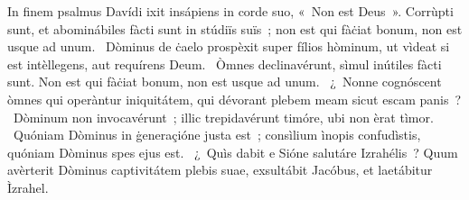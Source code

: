 { In finem psalmus Davídi}
{%
ixit insápiens in corde suo, «~Non est Deus~». Corrùpti sunt, et abominábiles fàcti sunt in stúdiïs suïs~; non est qui fàċiat bonum, non est usque ad unum. 
~Dòminus de ċaelo prospèxit super fílios hòminum, ut vìdeat si est intèllegens, aut requírens Deum. 
~Òmnes declinavérunt, sìmul inútiles fàcti sunt. Non est qui fàċiat bonum, non est usque ad unum. 
~¿~Nonne cognóscent òmnes qui operàntur iniquitátem, qui dévorant plebem meam sicut escam panis~? 
~Dòminum non invocavérunt~; illic trepidavérunt timóre, ubi non èrat tìmor. 
~Quóniam Dòminus in ġeneraçióne justa est~; consìlium ìnopis confudìstis, quóniam Dòminus spes ejus est. 
~¿~Quìs dabit e Sióne salutáre Izrahélis~? Quum avèrterit Dòminus captivitátem plebis suae, exsultábit Jacóbus, et laetábitur Ìzrahel. 
}
